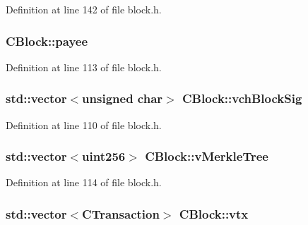 Definition at line 142 of file block.\+h.

\hypertarget{class_c_block_a1604a6d25f313ab1bf4e3777a6cba948}{}
\subsubsection[{payee}]{ C\+Block\+::payee\hspace{0.3cm}{\ttfamily [mutable]}}\label{class_c_block_a1604a6d25f313ab1bf4e3777a6cba948}


Definition at line 113 of file block.\+h.

\hypertarget{class_c_block_a78f882e24c4416f42039cbc6a67faf6e}{}
\subsubsection[{vch\+Block\+Sig}]{\setlength{\rightskip}{0pt plus 5cm}std\+::vector$<$unsigned char$>$ C\+Block\+::vch\+Block\+Sig}\label{class_c_block_a78f882e24c4416f42039cbc6a67faf6e}


Definition at line 110 of file block.\+h.

\hypertarget{class_c_block_a019ae6579acd08974653d3f443dd398a}{}
\subsubsection[{v\+Merkle\+Tree}]{\setlength{\rightskip}{0pt plus 5cm}std\+::vector$<${\bf uint256}$>$ C\+Block\+::v\+Merkle\+Tree\hspace{0.3cm}{\ttfamily [mutable]}}\label{class_c_block_a019ae6579acd08974653d3f443dd398a}


Definition at line 114 of file block.\+h.

\hypertarget{class_c_block_a9b6508d662722775f3029b980b382b66}{}
\subsubsection[{vtx}]{\setlength{\rightskip}{0pt plus 5cm}std\+::vector$<${\bf C\+Transaction}$>$ C\+Block\+::vtx}\label{class_c_block_a9b6508d662722775f3029b980b382b66}


